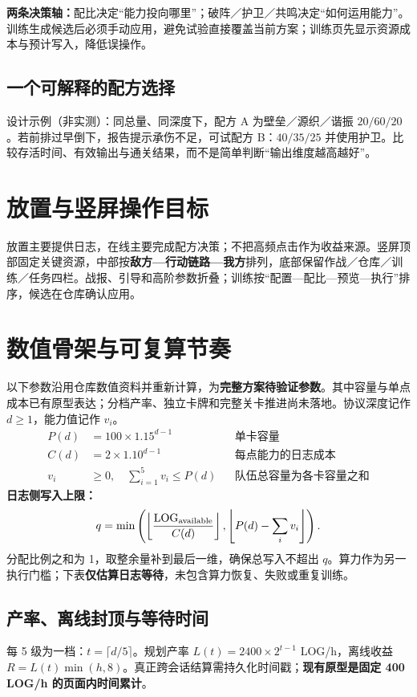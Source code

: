 \documentclass[UTF8,10pt,a4paper,fontset=fandol]{ctexart}
\begin{document}
\textbf{两条决策轴：}配比决定“能力投向哪里”；破阵／护卫／共鸣决定“如何运用能力”。训练生成候选后必须手动应用，避免试验直接覆盖当前方案；训练页先显示资源成本与预计写入，降低误操作。

\subsection{一个可解释的配方选择}
设计示例（非实测）：同总量、同深度下，配方 A 为壁垒／源织／谐振 $20/60/20$。若前排过早倒下，报告提示承伤不足，可试配方 B：$40/35/25$ 并使用护卫。比较存活时间、有效输出与通关结果，而不是简单判断“输出维度越高越好”。

\section{放置与竖屏操作目标}
放置主要提供日志，在线主要完成配方决策；不把高频点击作为收益来源。竖屏顶部固定关键资源，中部按\textbf{敌方—行动链路—我方}排列，底部保留作战／仓库／训练／任务四栏。战报、引导和高阶参数折叠；训练按“配置—配比—预览—执行”排序，候选在仓库确认应用。

\newpage
\section{数值骨架与可复算节奏}
以下参数沿用仓库数值资料并重新计算，为\textbf{完整方案待验证参数}。其中容量与单点成本已有原型表达；分档产率、独立卡牌和完整关卡推进尚未落地。协议深度记作 $d\ge1$，能力值记作 $v_i$。
\begin{align*}
P(d)&=100\times1.15^{d-1} &&\text{单卡容量}\\
C(d)&=2\times1.10^{d-1} &&\text{每点能力的日志成本}\\
v_i&\ge0,\quad \sum_{i=1}^{5}v_i\le P(d) &&\text{队伍总容量为各卡容量之和}
\end{align*}
\textbf{日志侧写入上限：}
\[
q=\min\left(\left\lfloor\frac{\mathrm{LOG}_{\rm available}}{C(d)}\right\rfloor,
\left\lfloor P(d)-\sum_i v_i\right\rfloor\right).
\]
分配比例之和为 1，取整余量补到最后一维，确保总写入不超出 $q$。算力作为另一执行门槛；下表\textbf{仅估算日志等待}，未包含算力恢复、失败或重复训练。

\subsection{产率、离线封顶与等待时间}
每 5 级为一档：$t=\lceil d/5\rceil$。规划产率 $L(t)=2400\times2^{t-1}$ LOG/h，离线收益 $R=L(t)\min(h,8)$。真正跨会话结算需持久化时间戳；\textbf{现有原型是固定 400 LOG/h 的页面内时间累计}。
\end{document}
